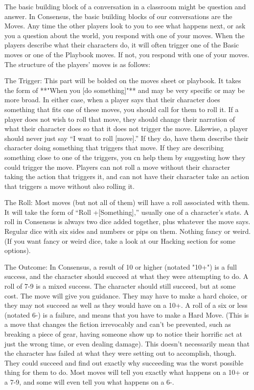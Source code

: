 \documentclass[
  oneside,
  statementpaper,
  9pt]{memoir}
\begin{document}
\begin{MC}

The basic building block of a conversation in a classroom might be question and answer. In Consensus, the basic building blocks of our conversations are the Moves. Any time the other players look to you to see what happens next, or ask you a question about the world, you respond with one of your moves. When the players describe what their characters do, it will often trigger one of the Basic moves or one of the Playbook moves. If not, you respond with one of your moves. The structure of the players' moves is as follows:

The Trigger: This part will be bolded on the moves sheet or playbook. It takes the form of **"When you [do something]"** and may be very specific or may be more broad. In either case, when a player says that their character does something that fits one of these moves, you should call for them to roll it. If a player does not wish to roll that move, they should change their narration of what their character does so that it does not trigger the move. Likewise, a player should never just say “I want to roll [move].” If they do, have them describe their character doing something that triggers that move. If they are describing something close to one of the triggers, you cn help them by suggesting how they could trigger the move. Players can not roll a move without their character taking the action that triggers it, and can not have their character take an action that triggers a move without also rolling it.

The Roll: Most moves (but not all of them) will have a roll associated with them. It will take the form of “Roll +[Something],” usually one of a character’s stats. A roll in Consensus is always two dice added together, plus whatever the move says. Regular dice with six sides and numbers or pips on them. Nothing fancy or weird. (If you want fancy or weird dice, take a look at our Hacking section for some options). 

The Outcome: In Consensus, a result of 10 or higher (notated "10+") is a full success, and the character should succeed at what they were attempting to do. A roll of 7-9 is a mixed success. The character should still succeed, but at some cost. The move will give you guidance. They may have to make a hard choice, or they may not succeed as well as they would have on a 10+. A roll of a six or less (notated 6-) is a failure, and means that you have to make a Hard Move. (This is a move that changes the fiction irrevocably and can’t be prevented, such as breaking a piece of gear, having someone show up to notice their horrific act at just the wrong time, or even dealing damage). This doesn’t necessarily mean that the character has failed at what they were setting out to accomplish, though. They could succeed and find out exactly why succeeding was the worst possible thing for them to do. Most moves will tell you exactly what happens on a 10+ or a 7-9, and some will even tell you what happens on a 6-.

\end{MC}
\end{document}
